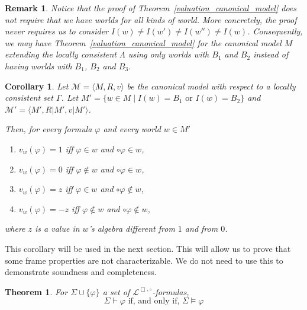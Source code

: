 \documentclass{amsart}
\newtheorem{theorem}{Theorem}[section]
\newtheorem{corollary}{Corollary}[section]
\newcommand{\pair}[1]{\langle #1 \rangle}
\newtheorem{remark}{Remark}
\begin{document}
\begin{remark}
    Notice that the proof of Theorem~\ref{valuation_canonical_model} does not require that we have worlds for all kinds of world. 
    More concretely, the proof never requires us to consider $I(w) \neq I(w') \neq I(w'') \neq I(w)$.
    Consequently, we may have Theorem~\ref{valuation_canonical_model} for the canonical model $M$ extending the locally consistent $\Lambda$ using only worlds with $B_1$ and $B_2$ instead of having worlds with $B_1$, $B_2$ and $B_3$.
\end{remark}

\begin{corollary}\label{valuation_canonical_model_2lattices}
    Let $\mathcal{M} = \pair{M, R, v}$ be the canonical model with respect to a locally consistent set $\Gamma$. Let $M' = \{w \in M \mid I(w) = B_1 \text{ or } I(w) = B_2\}$ and $\mathcal{M}' = \pair{M', R|M', v|M'}$.
    
    Then, for every formula $\varphi$ and every world $w \in M'$
    \begin{enumerate}
        \item $v_w(\varphi) = 1$ iff $\varphi \in w$ and $\circ \varphi \in w$,
        \item $v_w(\varphi) = 0$ iff $\varphi \notin w$ and $\circ \varphi \in w$,
        \item $v_w(\varphi) = z$ iff $\varphi \in w$ and $\circ \varphi \notin w$,
        \item $v_w(\varphi) = -z$ iff $\varphi \notin w$ and $\circ \varphi \notin w$,
    \end{enumerate}
    where $z$ is a value in $w$'s algebra different from $1$ and from $0$.
\end{corollary}

This corollary will be used in the next section. This will allow us to prove that some frame properties are not characterizable. We do not need to use this to demonstrate soundness and completeness.

\begin{theorem}\label{sound-complete-modal}
     For $\Sigma \cup \{\varphi\}$ a set of $\mathcal{L}^{\Box,\circ}$-formulas,
     $$\Sigma \vdash \varphi \text{ if, and only if, } \Sigma \vDash \varphi$$
\end{theorem}
\end{document}
